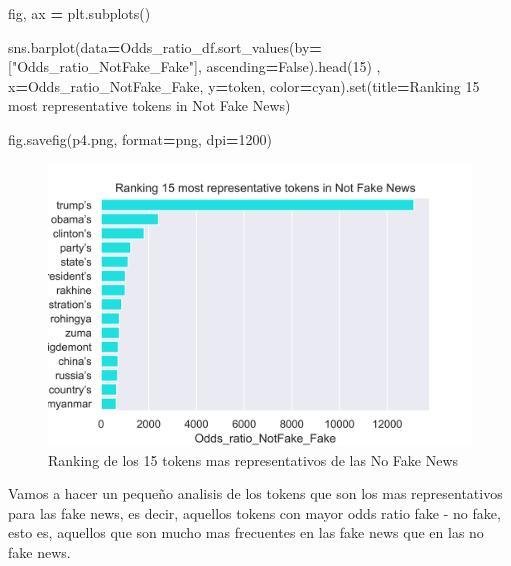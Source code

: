 \documentclass[
  11pt,
  a4paper,
]{article}
\newenvironment{Shaded}{\begin{snugshade}}{\end{snugshade}}
\newcommand{\BuiltInTok}[1]{#1}
\newcommand{\DecValTok}[1]{\textcolor[rgb]{0.00,0.00,0.81}{#1}}
\newcommand{\NormalTok}[1]{#1}
\newcommand{\OperatorTok}[1]{\textcolor[rgb]{0.81,0.36,0.00}{\textbf{#1}}}
\newcommand{\StringTok}[1]{\textcolor[rgb]{0.31,0.60,0.02}{#1}}
\newcommand{\VariableTok}[1]{\textcolor[rgb]{0.00,0.00,0.00}{#1}}
\begin{document}
\begin{Shaded}
\begin{Highlighting}[]
\NormalTok{fig, ax }\OperatorTok{=}\NormalTok{ plt.subplots()}

\NormalTok{sns.barplot(data}\OperatorTok{=}\NormalTok{Odds\_ratio\_df.sort\_values(by}\OperatorTok{=}\NormalTok{[}\StringTok{"Odds\_ratio\_NotFake\_Fake"}\NormalTok{], ascending}\OperatorTok{=}\VariableTok{False}\NormalTok{).head(}\DecValTok{15}\NormalTok{) ,}
\NormalTok{                 x}\OperatorTok{=}\StringTok{\textquotesingle{}Odds\_ratio\_NotFake\_Fake\textquotesingle{}}\NormalTok{, y}\OperatorTok{=}\StringTok{\textquotesingle{}token\textquotesingle{}}\NormalTok{, color}\OperatorTok{=}\StringTok{\textquotesingle{}cyan\textquotesingle{}}\NormalTok{).}\BuiltInTok{set}\NormalTok{(title}\OperatorTok{=}\StringTok{\textquotesingle{}Ranking 15 most representative tokens in Not Fake News\textquotesingle{}}\NormalTok{) }
                 
\NormalTok{fig.savefig(}\StringTok{\textquotesingle{}p4.png\textquotesingle{}}\NormalTok{, }\BuiltInTok{format}\OperatorTok{=}\StringTok{\textquotesingle{}png\textquotesingle{}}\NormalTok{, dpi}\OperatorTok{=}\DecValTok{1200}\NormalTok{)}
\end{Highlighting}
\end{Shaded}

\begin{figure}
\centering
\includegraphics{p4.png}
\caption{Ranking de los 15 tokens mas representativos de las No Fake
News}
\end{figure}

Vamos a hacer un pequeño analisis de los tokens que son los mas
representativos para las fake news, es decir, aquellos tokens con mayor
odds ratio fake - no fake, esto es, aquellos que son mucho mas
frecuentes en las fake news que en las no fake news.
\end{document}
